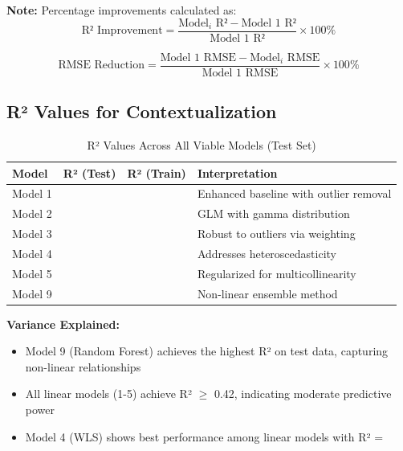 \textbf{Note:} Percentage improvements calculated as:
\begin{equation}
\text{R² Improvement} = \frac{\text{Model}_i\text{ R²} - \text{Model 1 R²}}{\text{Model 1 R²}} \times 100\%
\end{equation}

\begin{equation}
\text{RMSE Reduction} = \frac{\text{Model 1 RMSE} - \text{Model}_i\text{ RMSE}}{\text{Model 1 RMSE}} \times 100\%
\end{equation}


\subsection{R² Values for Contextualization}

\begin{table}[h!]
\centering
\caption{R² Values Across All Viable Models (Test Set)}
\label{tab:r2_comparison}
\begin{tabular}{lccl}
\toprule
\textbf{Model} & \textbf{R² (Test)} & \textbf{R² (Train)} & \textbf{Interpretation} \\
\midrule
Model 1 & \ModelOneRSquaredTest{} & \ModelOneRSquaredTrain{} & Enhanced baseline with outlier removal \\
Model 2 & \ModelTwoRSquaredTest{} & \ModelTwoRSquaredTrain{} & GLM with gamma distribution \\
Model 3 & \ModelThreeRSquaredTest{} & \ModelThreeRSquaredTrain{} & Robust to outliers via weighting \\
Model 4 & \ModelFourRSquaredTest{} & \ModelFourRSquaredTrain{} & Addresses heteroscedasticity \\
Model 5 & \ModelFiveRSquaredTest{} & \ModelFiveRSquaredTrain{} & Regularized for multicollinearity \\
Model 9 & \ModelNineRSquaredTest{} & \ModelNineRSquaredTrain{} & Non-linear ensemble method \\
\bottomrule
\end{tabular}
\end{table}

\textbf{Variance Explained:}
\begin{itemize}
    \item Model 9 (Random Forest) achieves the highest R² on test data, capturing non-linear relationships
    \item All linear models (1-5) achieve R² $\geq$ 0.42, indicating moderate predictive power
    \item Model 4 (WLS) shows best performance among linear models with R² = \ModelFourRSquaredTest{}
\end{itemize}

